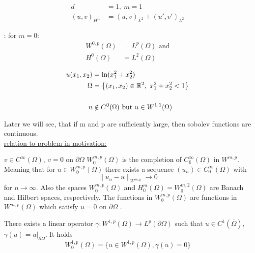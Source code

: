 \begin{example}
	\begin{align*}
		d&=1,\ m=1\\
		(u,v)_{H^m} &= (u,v)_{L^2} + (u',v')_{L^2}
	\end{align*} 
\end{example}

 
\begin{remark}: for $m=0$:
	\begin{align*}
		W^{0,p}(\Omega) &= L^p(\Omega) \text{ and} \\H^0(\Omega) &= L^2(\Omega)
	\end{align*} 
\end{remark}

\begin{example}
	\begin{align*}
	u(x_1,x_2) &= \text{ln}(x^2_1 + x^2_2)\\
	\Omega &= \big \{  (x_1,x_2)\in\mathbb{R}^2,\ x^2_1 + x^2_2 < 1    \big \} \\
	& \\
	u &\notin C^0(\Omega) \text{ but } u \in W^{1,1}(\Omega)
	\end{align*}
\end{example}
 
Later we will see, that if m and p are sufficiently large, then sobolev functions are continuous.\\
 
\underline{relation to problem in motivation:}\\

%
%
%
%
%

\par
\glqq $v \in C^\infty(\Omega),\ v=0 \text{ on } \partial\Omega$ \grqq \enter
$W^{m,p}_0(\Omega)$ is the completion of $C^\infty_0(\Omega)$ in $ W^{m,p} $. Meaning that for $u \in W^{m,p}_0(\Omega)$ there exists a sequence $(u_n) \in C^\infty_0(\Omega)$ with 
\begin{equation*}
	\|u_n - u\|_{W^{m,p}} \to 0
\end{equation*}
for $n \to \infty$.\enter
Also the spaces $W^{m,p}_0(\Omega)$ and $H^m_0(\Omega) = W^{m,2}_0(\Omega)$ are Banach and Hilbert spaces, respectively. The functions in $W^{m,p}_0(\Omega)$ are functions in $W^{m,p}(\Omega)$ which satisfy \glqq $u =0$ on $\partial \Omega$ \grqq. \enter 
\par

There exists a linear operator $\gamma: W^{1,p}(\Omega) \to L^p(\partial\Omega)$ such that $u \in C^1(\overline{\Omega})$, $\gamma(u) = u|_{\partial \Omega}$. It holds 
\begin{equation*}
	W^{1,p}_0(\Omega) = \big \{ u \in W^{1,p}(\Omega), \gamma(u) = 0 \big \}
\end{equation*}

